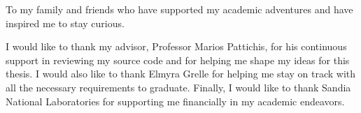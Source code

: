 \documentclass[botnum, fleqn, final]{unmeethesis}
\begin{document}

  \begin{figure}
 \centering
 
\end{figure}
  \frontmatter



  \title{}

  \author{Cody Wilson Eilar}
  \date{December, 2016}

  \maketitle


  \begin{dedication}
    To my family and friends who have supported my academic adventures and
    have inspired me to stay curious.
  \end{dedication}


  \begin{acknowledgments}
    \vspace{1.1in}
    I would like to thank my advisor, Professor Marios Pattichis, for his
    continuous support in reviewing my source code and for helping me shape my
    ideas for this thesis. I would also like to thank Elmyra Grelle for helping
    me stay on track with all the necessary requirements to graduate. Finally, I
    would like to thank Sandia National Laboratories for supporting me
    financially in my academic endeavors.
  \end{acknowledgments}

  \maketitleabstract %
\end{document}

